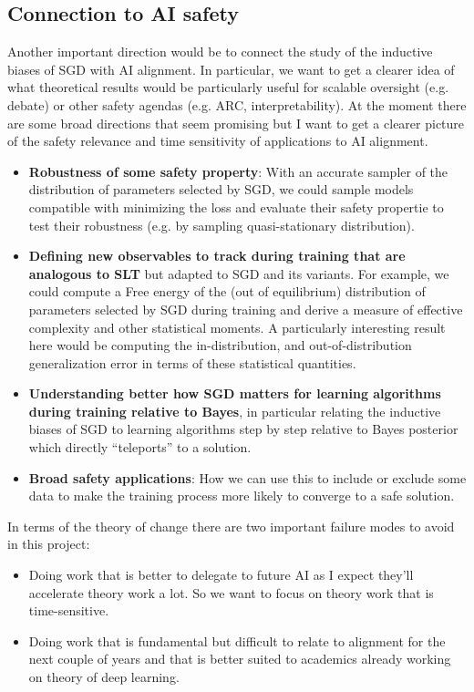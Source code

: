 \documentclass[11pt]{article}
\begin{document}
\subsection*{Connection to AI safety}
Another important direction would be to connect the study of the inductive biases of SGD with AI alignment. In  particular, we want to get a clearer idea of what theoretical results would be particularly useful for scalable oversight (e.g. debate) or other safety agendas (e.g. ARC, interpretability). At the moment there are some broad directions that seem promising but I want to get a clearer picture of the safety relevance and time sensitivity of applications to AI alignment.
\begin{itemize}
\item \textbf{Robustness of some safety property}: With an accurate sampler of the distribution of parameters selected by SGD, we could sample models compatible with minimizing the loss and evaluate their safety propertie to test their robustness (e.g. by sampling quasi-stationary distribution).
\item \textbf{Defining new observables to track during training that are analogous to SLT} but adapted to SGD and its variants. For example, we could compute a Free energy of the (out of equilibrium) distribution of parameters selected by SGD during training and derive a measure of effective complexity and other statistical moments. A particularly interesting result here would be computing the in-distribution, and out-of-distribution generalization error in terms of these statistical quantities.
\item \textbf{Understanding better how SGD matters for learning algorithms during training relative to Bayes}, in particular relating the inductive biases of SGD to learning algorithms step by step relative to Bayes posterior which directly ``teleports'' to a solution.
\item \textbf{Broad safety applications}: How we can use this to include or exclude some data to make the training process more likely to converge to a safe solution.
\end{itemize}
In terms of the theory of change there are two important failure modes to avoid in this project:
\begin{itemize}
\item Doing work that is better to delegate to future AI as I expect they'll accelerate theory work a lot. So we want to focus on theory work that is time-sensitive.
\item Doing work that is fundamental but difficult to relate to alignment for the next couple of years and that is better suited to academics already working on theory of deep learning.
\end{itemize}
\end{document}
